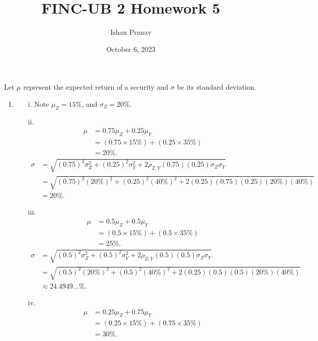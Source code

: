 \documentclass[12pt]{article}
\title{FINC-UB 2 Homework 5}
\author{Ishan Pranav}
\date{October 6, 2023}
\begin{document}
\maketitle
\section{}
Let $\mu$ represent the expected return of a security and $\sigma$ be its standard deviation.
\begin{enumerate}
    \item
    \begin{enumerate}
        \item[i.] Note $\mu_Z=15\%$, and $\sigma_Z=20\%$.
        \item[ii.]
        \begin{align*}
        \mu
        &=0.75\mu_Z+0.25\mu_Y\\
        &=(0.75\times 15\%)+(0.25\times 35\%)\\
        &=20\%.
        \end{align*}
        \begin{align*}
        \sigma
        &=\sqrt{(0.75)^2\sigma_Z^2+(0.25)^2\sigma_Y^2+2\rho_{Z,Y}(0.75)(0.25)\sigma_Z\sigma_Y}\\
        &=\sqrt{(0.75)^2(20\%)^2+(0.25)^2(40\%)^2+2(0.25)(0.75)(0.25)(20\%)(40\%)}\\
        &=20\%.
        \end{align*}
        \item[iii.]
        \begin{align*}
        \mu
        &=0.5\mu_Z+0.5\mu_Y\\
        &=(0.5\times 15\%)+(0.5\times 35\%)\\
        &=25\%.
        \end{align*}
        \begin{align*}
        \sigma
        &=\sqrt{(0.5)^2\sigma_Z^2+(0.5)^2\sigma_Y^2+2\rho_{Z,Y}(0.5)(0.5)\sigma_Z\sigma_Y}\\
        &=\sqrt{(0.5)^2(20\%)^2+(0.5)^2(40\%)^2+2(0.25)(0.5)(0.5)(20\%)(40\%)}\\
        &\approx 24.4949\dots\%.
        \end{align*}
        \item[iv.]
        \begin{align*}
        \mu
        &=0.25\mu_Z+0.75\mu_Y\\
        &=(0.25\times 15\%)+(0.75\times 35\%)\\
        &=30\%.
        \end{align*}

\end{enumerate}
\end{enumerate}
\end{document}
